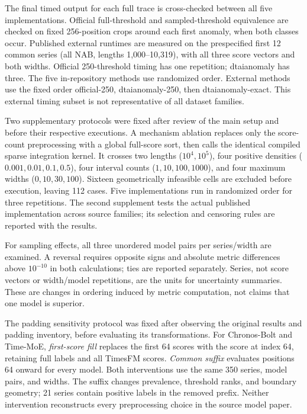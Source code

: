 The final timed output for each full trace is cross-checked between all five
implementations. Official
full-threshold and sampled-threshold equivalence are checked on fixed
256-position crops around each first anomaly, when both classes occur.
Published external runtimes are measured on the prespecified first 12 common
series (all NAB, lengths 1,000--10,319), with all three score vectors and both
widths. Official 250-threshold timing has one repetition; dtaianomaly has three.
The five in-repository methods use randomized order. External methods use the
fixed order official-250, dtaianomaly-250, then dtaianomaly-exact. This external
timing subset is not representative of all dataset families.

Two supplementary protocols were fixed after review of the main setup and
before their respective executions. A mechanism ablation replaces only the
score-count preprocessing with a global full-score sort, then calls the
identical compiled sparse integration kernel. It crosses two lengths
($10^4,\allowbreak 10^5$), four positive densities ($0.001,\allowbreak 0.01,\allowbreak 0.1,\allowbreak 0.5$), four interval
counts ($1,\allowbreak 10,\allowbreak 100,\allowbreak 1000$), and four maximum widths ($0,\allowbreak 10,\allowbreak 30,\allowbreak 100$). Sixteen
geometrically infeasible cells are excluded before execution, leaving 112
cases. Five implementations run in randomized order for three repetitions.
The second supplement tests the actual published implementation across source
families; its selection and censoring rules are reported with the results.

For sampling effects, all three unordered model pairs per series/width are
examined. A reversal requires opposite signs and absolute metric differences
above $10^{-10}$ in both calculations; ties are reported separately. Series,
not score vectors or width/model repetitions, are the units for uncertainty
summaries. These are changes in ordering induced by metric computation, not
claims that one model is superior.

The padding sensitivity protocol was fixed after observing the original
results and padding inventory, before evaluating its transformations.
For Chronos-Bolt and Time-MoE, \emph{first-score fill} replaces the first
64 scores with the score at index 64, retaining full labels and all TimesFM
scores. \emph{Common suffix} evaluates positions 64 onward for every model.
Both interventions use the same 350 series, model pairs, and widths.
The suffix changes prevalence, threshold ranks, and boundary geometry;
21 series contain positive labels in the removed prefix. Neither intervention
reconstructs every preprocessing choice in the source model paper.

